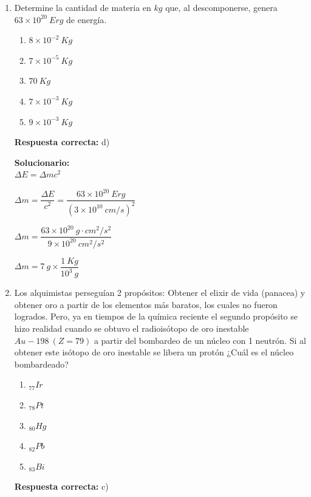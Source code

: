 \begin{enumerate}
	
	\item Determine la cantidad de materia en $kg$ que, al descomponerse, genera $63\times 10^{20}\ Erg$ de energía.
	
	\begin{enumerate}[label=\alph*)]
		\item $8\times 10^{-2}\ Kg$
		\item $7\times 10^{-5}\ Kg$
		\item $70\ Kg$
		\item $7\times 10^{-3}\ Kg$
		\item $9\times 10^{-3}\ Kg$
	\end{enumerate}
	\textbf{Respuesta correcta:} d)
	
	\vspace{2mm}
	\textbf{Solucionario:}\\
	
	$\Delta E=\Delta m c^2$
	
	$\Delta m=\dfrac{\Delta E}{c^2}=\dfrac{63\times 10^{20}\ Erg}{(3\times 10^{10}\ cm/s)^2}$
	
	$\Delta m=\dfrac{63\times 10^{20}\ g\cdot cm^2/s^2}{9\times 10^{20}\ cm^2/s^2}$
	
	$\Delta m=7\ g\times \dfrac{1\ Kg}{10^3\ g}$
	
	
	\vspace{6mm}
	
	\item Los alquimistas perseguían 2 propósitos: Obtener el elixir de vida (panacea) y obtener oro a partir de los elementos más baratos, los cuales no fueron logrados. Pero, ya en tiempos de la química reciente el segundo propósito se hizo realidad cuando se obtuvo el radioisótopo de oro inestable $Au-198\ (Z=79)$ a partir del bombardeo de un núcleo con 1 neutrón. Si al obtener este isótopo de oro inestable se libera un protón ¿Cuál es el núcleo bombardeado?
	
	\begin{enumerate}[label=\alph*)]
		\item $_{77}Ir$
		\item $_{78}Pt$
		\item $_{80}Hg$
		\item $_{82}Pb$
		\item $_{83}Bi$
	\end{enumerate}
	\textbf{Respuesta correcta:} c)
	

\end{enumerate}
